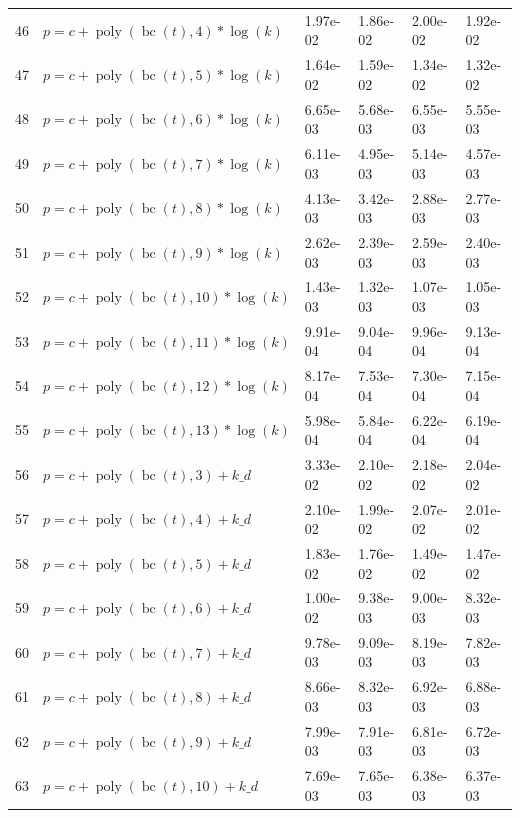 \documentclass[12pt,a4paper]{article}
\DeclareMathOperator{\bc}{bc}
\DeclareMathOperator{\poly}{poly}
\begin{document}
\begin{longtable}[t]{ll>{\raggedleft\arraybackslash}p{2cm}>{\raggedleft\arraybackslash}p{2cm}>{\raggedleft\arraybackslash}p{2cm}>{\raggedleft\arraybackslash}p{2cm}}
46 & $p = c + \poly\left( \bc(t), 4 \right) * \log(k)$ & 1.97e-02 & 1.86e-02 & 2.00e-02 & 1.92e-02\\
\rowcolor{gray!6}  47 & $p = c + \poly\left( \bc(t), 5 \right) * \log(k)$ & 1.64e-02 & 1.59e-02 & 1.34e-02 & 1.32e-02\\
48 & $p = c + \poly\left( \bc(t), 6 \right) * \log(k)$ & 6.65e-03 & 5.68e-03 & 6.55e-03 & 5.55e-03\\
\rowcolor{gray!6}  49 & $p = c + \poly\left( \bc(t), 7 \right) * \log(k)$ & 6.11e-03 & 4.95e-03 & 5.14e-03 & 4.57e-03\\
50 & $p = c + \poly\left( \bc(t), 8 \right) * \log(k)$ & 4.13e-03 & 3.42e-03 & 2.88e-03 & 2.77e-03\\
\rowcolor{gray!6}  51 & $p = c + \poly\left( \bc(t), 9 \right) * \log(k)$ & 2.62e-03 & 2.39e-03 & 2.59e-03 & 2.40e-03\\
52 & $p = c + \poly\left( \bc(t), 10 \right) * \log(k)$ & 1.43e-03 & 1.32e-03 & 1.07e-03 & 1.05e-03\\
\rowcolor{gray!6}  53 & $p = c + \poly\left( \bc(t), 11 \right) * \log(k)$ & 9.91e-04 & 9.04e-04 & 9.96e-04 & 9.13e-04\\
54 & $p = c + \poly\left( \bc(t), 12 \right) * \log(k)$ & 8.17e-04 & 7.53e-04 & 7.30e-04 & 7.15e-04\\
\rowcolor{gray!6}  55 & $p = c + \poly\left( \bc(t), 13 \right) * \log(k)$ & 5.98e-04 & 5.84e-04 & 6.22e-04 & 6.19e-04\\
56 & $p = c + \poly\left( \bc(t), 3 \right) + k\_d$ & 3.33e-02 & 2.10e-02 & 2.18e-02 & 2.04e-02\\
\rowcolor{gray!6}  57 & $p = c + \poly\left( \bc(t), 4 \right) + k\_d$ & 2.10e-02 & 1.99e-02 & 2.07e-02 & 2.01e-02\\
58 & $p = c + \poly\left( \bc(t), 5 \right) + k\_d$ & 1.83e-02 & 1.76e-02 & 1.49e-02 & 1.47e-02\\
\rowcolor{gray!6}  59 & $p = c + \poly\left( \bc(t), 6 \right) + k\_d$ & 1.00e-02 & 9.38e-03 & 9.00e-03 & 8.32e-03\\
60 & $p = c + \poly\left( \bc(t), 7 \right) + k\_d$ & 9.78e-03 & 9.09e-03 & 8.19e-03 & 7.82e-03\\
\rowcolor{gray!6}  61 & $p = c + \poly\left( \bc(t), 8 \right) + k\_d$ & 8.66e-03 & 8.32e-03 & 6.92e-03 & 6.88e-03\\
62 & $p = c + \poly\left( \bc(t), 9 \right) + k\_d$ & 7.99e-03 & 7.91e-03 & 6.81e-03 & 6.72e-03\\
\rowcolor{gray!6}  63 & $p = c + \poly\left( \bc(t), 10 \right) + k\_d$ & 7.69e-03 & 7.65e-03 & 6.38e-03 & 6.37e-03\\

\end{longtable}
\end{document}
